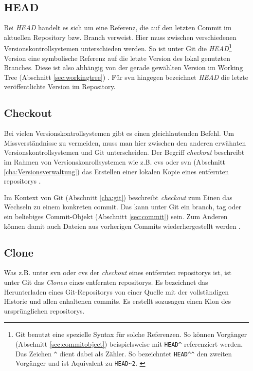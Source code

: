 \subsection{HEAD}\label{sec:head}
Bei \textit{HEAD} handelt es sich um eine Referenz, die auf den letzten Commit
im aktuellen Repository bzw. Branch verweist. Hier muss zwischen verschiedenen
Versionskontrollsystemen unterschieden werden. So ist unter Git die
\textit{HEAD}\footnote{Git benutzt eine spezielle Syntax für solche Referenzen.
So können Vorgänger (Abschnitt \ref{sec:commitobject}) beispielsweise mit
\texttt{HEAD\^{}} referenziert werden. Das Zeichen \texttt{\^{}} dient dabei
als Zähler. So bezeichntet \texttt{HEAD\^{}\^{}} den zweiten Vorgänger und ist
Aquivalent zu \texttt{HEAD\~{}2}. \cite[S.~65]{gitosp}} Version eine
symbolische Referenz auf die letzte Version des lokal genutzten Branches. Diese
ist also abhängig von der gerade gewählten Version im Working Tree (Abschnitt
\ref{sec:workingtree}) \cite[S.~20]{gitosp}. Für \acrshort{svn} hingegen
bezeichnet \textit{HEAD} die letzte veröffentlichte Version im Repository.

\subsection{Checkout}\label{sec:checkout}
Bei vielen Versionskontrollsystemen gibt es einen gleichlautenden Befehl.
Um Missverständnisse zu vermeiden, muss man hier zwischen den anderen erwähnten
Versionskontrollsystemen und Git unterscheiden. Der Begriff \textit{checkout}
beschreibt im Rahmen von Versionskonrollsystemen wie z.B. \acrshort{cvs} oder
\acrshort{svn} (Abschnitt \ref{cha:Versionsverwaltung}) das Erstellen einer
lokalen Kopie eines entfernten \glspl{repository} \cite[S~137]{gitosp}.

Im Kontext von Git (Abschnitt \ref{cha:git}) beschreibt \textit{checkout} zum
Einen das Wechseln zu einem konkreten \gls{commit}. Das kann unter Git ein
\gls{branch}, \gls{tag} oder ein beliebiges Commit-Objekt (Abschnitt
\ref{sec:commit}) sein. Zum Anderen können damit auch Dateien aus vorherigen
Commits wiederhergestellt werden \cite[S~76]{gitosp}.

\subsection{Clone}\label{sec:clone}
Was z.B. unter \acrshort{svn} oder \acrshort{cvs} der \textit{checkout} eines
entfernten \glspl{repository} ist, ist unter Git das \textit{Clonen} eines
entfernten \glspl{repository}. Es bezeichnet das Herunterladen eines
Git-Repositorys von einer Quelle mit der vollständigen Historie und allen
enhaltenen \glspl{commit}. Es erstellt sozusagen einen Klon des
ursprünglichen \glspl{repository}. \cite[S.~21]{gitosp}

